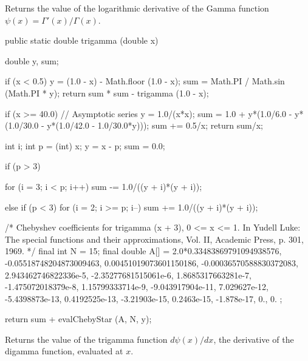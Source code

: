 \begin{tabb}
   Returns the value of the logarithmic derivative of the Gamma function
   $\psi(x) = \Gamma'(x) / \Gamma(x)$.
\end{tabb}
\begin{code}

   public static double trigamma (double x)\begin{hide} {
      double y, sum;

      if (x < 0.5) {
         y = (1.0 - x) - Math.floor (1.0 - x);
         sum = Math.PI / Math.sin (Math.PI * y);
         return  sum * sum - trigamma (1.0 - x);
      }

      if (x >= 40.0) {
         // Asymptotic series
         y = 1.0/(x*x);
         sum = 1.0 + y*(1.0/6.0 - y*(1.0/30.0 - y*(1.0/42.0 - 1.0/30.0*y)));
         sum += 0.5/x;
         return sum/x;
      }

      int i;
      int p = (int) x;
      y = x - p;
      sum = 0.0;

      if (p > 3) {
         for (i = 3; i < p; i++)
            sum -= 1.0/((y + i)*(y + i));

      } else if (p < 3) {
         for (i = 2; i >= p; i--)
            sum += 1.0/((y + i)*(y + i));
      }

      /* Chebyshev coefficients for trigamma (x + 3), 0 <= x <= 1. In Yudell
         Luke: The special functions and their approximations, Vol. II,
         Academic Press, p. 301, 1969. */
      final int N = 15;
      final double A[] = { 2.0*0.33483869791094938576, -0.05518748204873009463,
         0.00451019073601150186, -0.00036570588830372083,
         2.943462746822336e-5, -2.35277681515061e-6, 1.8685317663281e-7,
         -1.475072018379e-8, 1.15799333714e-9, -9.043917904e-11,
         7.029627e-12, -5.4398873e-13, 0.4192525e-13, -3.21903e-15, 0.2463e-15,
        -1.878e-17, 0., 0. };

      return sum + evalChebyStar (A, N, y);
   }\end{hide}
\end{code}
\begin{tabb}
   Returns the value of the trigamma function $d\psi(x)/dx$, the derivative of
   the digamma function, evaluated at $x$.
\end{tabb}
